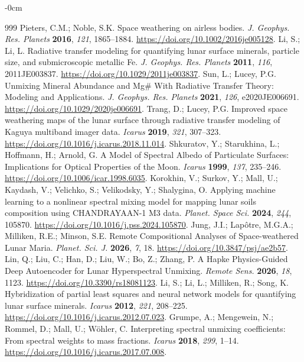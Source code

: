 \documentclass[remotesensing,article,submit,pdftex,moreauthors]{Definitions/mdpi}
\begin{document}
\begin{adjustwidth}{-\extralength}{0cm}
\begin{thebibliography}{999}
Pieters, C.M.; Noble, S.K. Space weathering on airless bodies. \emph{J. Geophys. Res. Planets} {\bf 2016}, \emph{121}, 1865--1884. \url{https://doi.org/10.1002/2016je005128}.
Li, S.; Li, L. Radiative transfer modeling for quantifying lunar surface minerals, particle size, and submicroscopic metallic Fe. \emph{J. Geophys. Res. Planets} {\bf 2011}, \emph{116}, 2011JE003837. \url{https://doi.org/10.1029/2011je003837}.
Sun, L.; Lucey, P.G. Unmixing Mineral Abundance and Mg\# With Radiative Transfer Theory: Modeling and Applications. \emph{J. Geophys. Res. Planets} {\bf 2021}, \emph{126}, e2020JE006691. \url{https://doi.org/10.1029/2020je006691}.
Trang, D.; Lucey, P.G. Improved space weathering maps of the lunar surface through radiative transfer modeling of Kaguya multiband imager data. \emph{Icarus} {\bf 2019}, \emph{321}, 307--323. \url{https://doi.org/10.1016/j.icarus.2018.11.014}.
Shkuratov, Y.; Starukhina, L.; Hoffmann, H.; Arnold, G. A Model of Spectral Albedo of Particulate Surfaces: Implications for Optical Properties of the Moon. \emph{Icarus} {\bf 1999}, \emph{137}, 235--246. \url{https://doi.org/10.1006/icar.1998.6035}.
Korokhin, V.; Surkov, Y.; Mall, U.; Kaydash, V.; Velichko, S.; Velikodsky, Y.; Shalygina, O. Applying machine learning to a nonlinear spectral mixing model for mapping lunar soils composition using CHANDRAYAAN-1 M3 data. \emph{Planet. Space Sci.} {\bf 2024}, \emph{244}, 105870. \url{https://doi.org/10.1016/j.pss.2024.105870}.
Jung, J.I.; Lapôtre, M.G.A.; Milliken, R.E.; Minson, S.E. Remote Compositional Analyses of Space-weathered Lunar Maria. \emph{Planet. Sci. J.} {\bf 2026}, \emph{7}, 18. \url{https://doi.org/10.3847/psj/ae2b57}.
Lin, Q.; Liu, C.; Han, D.; Liu, W.; Bo, Z.; Zhang, P. A Hapke Physics-Guided Deep Autoencoder for Lunar Hyperspectral Unmixing. \emph{Remote Sens.} {\bf 2026}, \emph{18}, 1123. \url{https://doi.org/10.3390/rs18081123}.
Li, S.; Li, L.; Milliken, R.; Song, K. Hybridization of partial least squares and neural network models for quantifying lunar surface minerals. \emph{Icarus} {\bf 2012}, \emph{221}, 208--225. \url{https://doi.org/10.1016/j.icarus.2012.07.023}.
Grumpe, A.; Mengewein, N.; Rommel, D.; Mall, U.; Wöhler, C. Interpreting spectral unmixing coefficients: From spectral weights to mass fractions. \emph{Icarus} {\bf 2018}, \emph{299}, 1--14. \url{https://doi.org/10.1016/j.icarus.2017.07.008}.

\end{thebibliography}
\end{adjustwidth}
\end{document}
